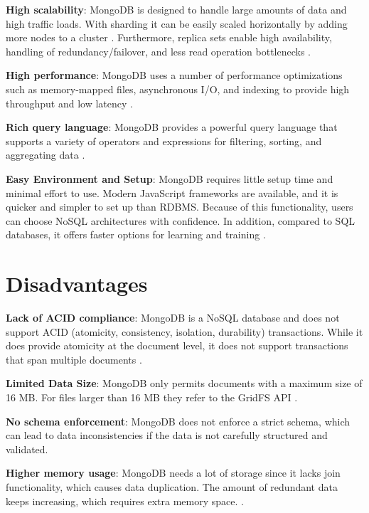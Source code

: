 \textbf{High scalability}: MongoDB is designed to handle large amounts of data and high traffic loads. With sharding it can be easily scaled horizontally by adding more nodes to a cluster \parencite{mongodb-scalability, dataflair_2018}. Furthermore, replica sets enable high availability, handling of redundancy/failover, and less read operation bottlenecks \parencite{mongodb-replica-sets}.

\textbf{High performance}: MongoDB uses a number of performance optimizations such as memory-mapped files, asynchronous I/O, and indexing to provide high throughput and low latency \parencite{mongodb-performance, knowledgenile-pro-con}.

\textbf{Rich query language}: MongoDB provides a powerful query language that supports a variety of operators and expressions for filtering, sorting, and aggregating data \parencite{mongodb-query}.

\textbf{Easy Environment and Setup}: MongoDB requires little setup time and minimal effort to use. Modern JavaScript frameworks are available, and it is quicker and simpler to set up than RDBMS.
Because of this functionality, users can choose NoSQL architectures with confidence. In addition, compared to SQL databases, it offers faster options for learning and training \parencite{knowledgenile-pro-con, jamsheer_2019}.

\section{Disadvantages}

\textbf{Lack of ACID compliance}: MongoDB is a NoSQL database and does not support ACID (atomicity, consistency, isolation, durability) transactions. While it does provide atomicity at the document level, it does not support transactions that span multiple documents \parencite{mongodb-transactions, knowledgenile-pro-con}.

\textbf{Limited Data Size}: MongoDB only permits documents with a maximum size of 16 MB. For files larger than 16 MB they refer to the GridFS \ac{API} \parencite{mongodb-documents}.

\textbf{No schema enforcement}: MongoDB does not enforce a strict schema, which can lead to data inconsistencies if the data is not carefully structured and validated.

\textbf{Higher memory usage}: MongoDB needs a lot of storage since it lacks join functionality, which causes data duplication. The amount of redundant data keeps increasing, which requires extra memory space. \parencite{knowledgenile-pro-con}.

